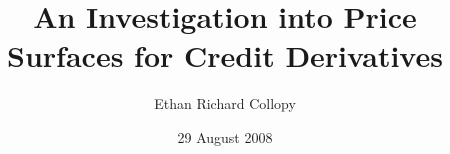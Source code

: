 \def \ttb{\begin{ttfamily}}
\def \tte{\end{ttfamily}}
\def \na{\newcounter{alg}\setcounter{alg}{1}\arabic{alg}}
\def \ra{\setcounter{alg}{1}\arabic{alg}}
\def \sa{\stepcounter{alg}\arabic{alg}}
\def \line{\renewcommand{\baselinestretch}{1}}

\documentclass[10pt,oneside]{erc_bbk_report}
\usepackage[pdftex]{graphicx}
\usepackage{latexsym,erc_bbk,makeidx,epstopdf,amssymb,apalike,amsmath}
\usepackage{hyperref}
\usepackage{listings}
\usepackage{setspace}






\usepackage{epstopdf}

\makeindex

\title{An Investigation into Price Surfaces for Credit Derivatives} 

\author{
Ethan Richard Collopy
}

\date{29 August 2008}  

\newcommand{\avec}[1]{\ensuremath{#1_1, \ldots, #1_n}}
\newcommand{\angavec}[1]{\ensuremath{\langle #1_1, \ldots, #1_n \rangle}}



         



\maketitle 
%


